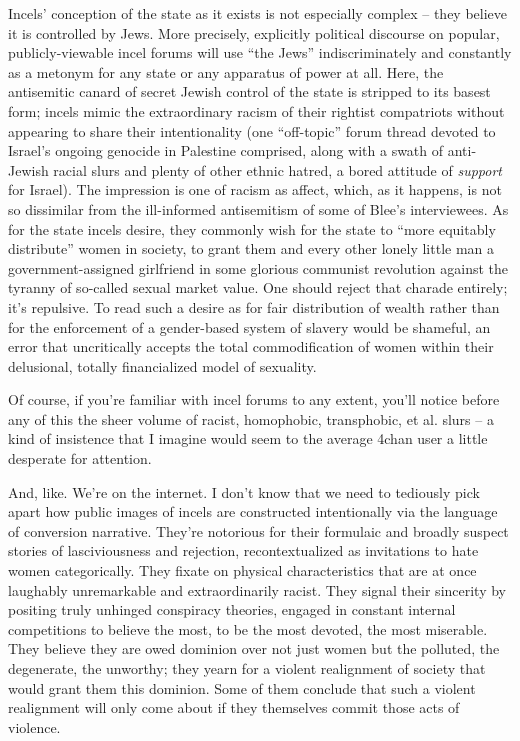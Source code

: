 \documentclass[11pt]{article}
\begin{document}
{{Incels' conception of the state as it exists is not especially complex -- they believe it is controlled by Jews. More precisely, explicitly political discourse on popular, publicly-viewable incel forums will use ``the Jews'' indiscriminately and constantly as a metonym for any state or any apparatus of power at all. Here, the antisemitic canard of secret Jewish control of the state is stripped to its basest form; incels mimic the extraordinary racism of their rightist compatriots without appearing to share their intentionality (one ``off-topic'' forum thread devoted to Israel's ongoing genocide in Palestine comprised, along with a swath of anti-Jewish racial slurs and plenty of other ethnic hatred, a bored attitude of \textit{support} for Israel). The impression is one of racism as affect, which, as it happens, is not so dissimilar from the ill-informed antisemitism of some of Blee's interviewees. As for the state incels desire, they commonly wish for the state to ``more equitably distribute'' women in society, to grant them and every other lonely little man a government-assigned girlfriend in some glorious communist revolution against the tyranny of so-called sexual market value. One should reject that charade entirely; it's repulsive. To read such a desire as for fair distribution of wealth rather than for the enforcement of a gender-based system of slavery would be shameful, an error that uncritically accepts the total commodification of women within their delusional, totally financialized model of sexuality.

Of course, if you're familiar with incel forums to any extent, you'll notice before any of this the sheer volume of racist, homophobic, transphobic, et al. slurs -- a kind of insistence that I imagine would seem to the average 4chan user a little desperate for attention.
}%
}%

And, like. We're on the internet. I don't know that we need to tediously pick apart how public images of incels are constructed intentionally via the language of conversion narrative. They're notorious for their formulaic and broadly suspect stories of lasciviousness and rejection, recontextualized as invitations to hate women categorically. They fixate on physical characteristics that are at once laughably unremarkable and extraordinarily racist. They signal their sincerity by positing truly unhinged conspiracy theories, engaged in constant internal competitions to believe the most, to be the most devoted, the most miserable. They believe they are owed dominion over not just women but the polluted, the degenerate, the unworthy; they yearn for a violent realignment of society that would grant them this dominion. Some of them conclude that such a violent realignment will only come about if they themselves commit those acts of violence. 
\end{document}
